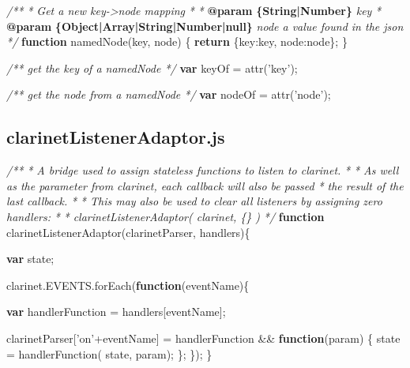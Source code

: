 \documentclass[12pt, ]{article}
\newenvironment{Shaded}{}{}
\newcommand{\KeywordTok}[1]{\textcolor[rgb]{0.00,0.44,0.13}{\textbf{{#1}}}}
\newcommand{\DataTypeTok}[1]{\textcolor[rgb]{0.56,0.13,0.00}{{#1}}}
\newcommand{\StringTok}[1]{\textcolor[rgb]{0.25,0.44,0.63}{{#1}}}
\newcommand{\CommentTok}[1]{\textcolor[rgb]{0.38,0.63,0.69}{\textit{{#1}}}}
\newcommand{\OtherTok}[1]{\textcolor[rgb]{0.00,0.44,0.13}{{#1}}}
\newcommand{\FunctionTok}[1]{\textcolor[rgb]{0.02,0.16,0.49}{{#1}}}
\newcommand{\NormalTok}[1]{{#1}}
\begin{document}
\label{src_ascent}

\begin{Shaded}
\begin{Highlighting}[]
\CommentTok{/**}
\CommentTok{ * Get a new key->node mapping}
\CommentTok{ * }
\CommentTok{ * }\KeywordTok{@param}\CommentTok{ }\KeywordTok{\{String|Number\}}\CommentTok{ key}
\CommentTok{ * }\KeywordTok{@param}\CommentTok{ }\KeywordTok{\{Object|Array|String|Number|null\}}\CommentTok{ node a value found in the json}
\CommentTok{ */}
\KeywordTok{function} \FunctionTok{namedNode}\NormalTok{(key, node) \{}
   \KeywordTok{return} \NormalTok{\{}\DataTypeTok{key}\NormalTok{:key, }\DataTypeTok{node}\NormalTok{:node\};}
\NormalTok{\}}

\CommentTok{/** get the key of a namedNode */}
\KeywordTok{var} \NormalTok{keyOf = }\FunctionTok{attr}\NormalTok{(}\StringTok{'key'}\NormalTok{);}

\CommentTok{/** get the node from a namedNode */}
\KeywordTok{var} \NormalTok{nodeOf = }\FunctionTok{attr}\NormalTok{(}\StringTok{'node'}\NormalTok{);}
\end{Highlighting}
\end{Shaded}

\pagebreak

\subsection{clarinetListenerAdaptor.js}\label{headerux5fclarinetListenerAdaptor}

\label{src_clarinetListenerAdaptor}

\begin{Shaded}
\begin{Highlighting}[]

\CommentTok{/** }
\CommentTok{ * A bridge used to assign stateless functions to listen to clarinet.}
\CommentTok{ * }
\CommentTok{ * As well as the parameter from clarinet, each callback will also be passed}
\CommentTok{ * the result of the last callback.}
\CommentTok{ * }
\CommentTok{ * This may also be used to clear all listeners by assigning zero handlers:}
\CommentTok{ * }
\CommentTok{ *    clarinetListenerAdaptor( clarinet, \{\} )}
\CommentTok{ */}
\KeywordTok{function} \FunctionTok{clarinetListenerAdaptor}\NormalTok{(clarinetParser, handlers)\{}
    
   \KeywordTok{var} \NormalTok{state;}

   \OtherTok{clarinet}\NormalTok{.}\OtherTok{EVENTS}\NormalTok{.}\FunctionTok{forEach}\NormalTok{(}\KeywordTok{function}\NormalTok{(eventName)\{}
 
      \KeywordTok{var} \NormalTok{handlerFunction = handlers[eventName];}
      
      \NormalTok{clarinetParser[}\StringTok{'on'}\NormalTok{+eventName] = handlerFunction && }
                                       \KeywordTok{function}\NormalTok{(param) \{}
                                          \NormalTok{state = }\FunctionTok{handlerFunction}\NormalTok{( state, param);}
                                       \NormalTok{\};}
   \NormalTok{\});}
\NormalTok{\}}
\end{Highlighting}
\end{Shaded}
\end{document}
